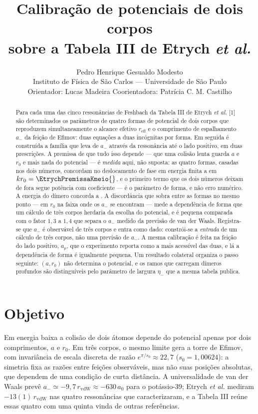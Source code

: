 \documentclass[11pt,a4paper]{article}
\title{\vspace{-1.3cm}\textbf{Calibração de potenciais de dois corpos\\
sobre a Tabela III de Etrych \textit{et al.}}}
\author{Pedro Henrique Gesualdo Modesto\\[2pt]
\small Instituto de Física de São Carlos --- Universidade de São Paulo\\
\small Orientador: Lucas Madeira \quad Coorientadora: Patrícia C. M. Castilho}
\date{\small\hoje}
\begin{document}
\maketitle
\vspace{-0.5cm}
\begin{abstract}
\noindent
Para cada uma das cinco ressonâncias de Feshbach da Tabela III de
Etrych \textit{et al.} [1] são determinados os parâmetros de quatro formas de
potencial de dois corpos que reproduzem simultaneamente o alcance efetivo
$r_\mathrm{eff}$ e o comprimento de espalhamento $a_-$ da feição de Efimov: duas
equações a duas incógnitas por forma. Em seguida é construída a família que
leva de $a_-$ através da ressonância até o lado positivo, em duas prescrições.
A premissa de que tudo isso depende --- que uma colisão lenta guarda $a$ e
$r_0$ e mais nada do potencial --- é \emph{medida} aqui, não suposta: as quatro
formas, casadas nos dois números, concordam no deslocamento de fase em energia
finita a \EtrychPremissaMeio{} em $k r_0=\EtrychPremissaKmeio{}$, e o primeiro
termo que os dois números deixam de fora segue potência
\EtrychPremissaPotencia{} com coeficiente \EtrychPremissaCoef{} --- é o
parâmetro de forma, e não erro numérico. A energia do dímero concorda a
\EtrychDimeroLeque{}. A discordância que sobra entre as formas no mesmo ponto
--- \EtrychLequeAmenos{} em $r_0$ na faixa onde os $a_-$ se encontram --- mede
a dependência de forma que um cálculo de três corpos herdaria da escolha do
potencial, e é pequena comparada com o fator $1{,}3$ a $1{,}4$ que separa o
$a_-$ medido da previsão de van der Waals. Registra-se que $a_-$ é observável
de três corpos e entra como dado: constrói-se a \emph{entrada} de um cálculo de
três corpos, não uma previsão de $a_-$. A mesma calibração é feita na feição do
lado positivo, $a_p$, que o experimento reporta como a mais acessível das duas,
e lá a dependência de forma é igualmente pequena. Um resultado colateral
organiza o passo seguinte: $(a,r_0)$ não determina o potencial, e os ramos que
carregam dímeros profundos são distinguíveis pelo parâmetro de largura
$\eta_-$ que a mesma tabela publica.
\end{abstract}

\section{Objetivo}

Em energia baixa a colisão de dois átomos depende do potencial apenas por dois
comprimentos, $a$ e $r_0$. Em três corpos, o mesmo limite gera a torre de
Efimov, com invariância de escala discreta de razão $e^{\pi/s_0}\approx22{,}7$
($s_0=1{,}00624$): a simetria fixa as razões entre feições observáveis, mas não
suas posições absolutas, que dependem de uma condição de curta distância. A
universalidade de van der Waals prevê
$a_-\simeq-9{,}7\,r_\mathrm{vdW}\approx-630\,a_0$ para o potássio-39;
Etrych \textit{et al.} mediram $-13(1)\,r_\mathrm{vdW}$ nas quatro ressonâncias
que caracterizaram, e a Tabela III reúne essas quatro com uma quinta vinda de
outras referências.
\end{document}
